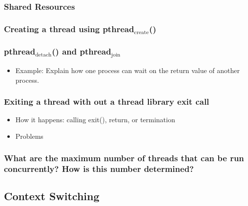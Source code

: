 \documentclass[11pt]{article}
\begin{document}
\subsubsection{Shared Resources}
\label{sec-6.2.1}

\subsubsection{Creating a thread using pthread$_{\mathrm{create}}$()}
\label{sec-6.2.2}

\subsubsection{pthread$_{\mathrm{detach}}$() and pthread$_{\mathrm{join}}$}
\label{sec-6.2.3}

\begin{itemize}

\item Example: Explain how one process can wait on the return value of another process.\\
\label{sec-6.2.3.1}

\end{itemize} %
\subsubsection{Exiting a thread with out a thread library exit call}
\label{sec-6.2.4}

\begin{itemize}

\item How it happens: calling exit(), return, or termination\\
\label{sec-6.2.4.1}


\item Problems\\
\label{sec-6.2.4.2}

\end{itemize} %
\subsubsection{What are the maximum number of threads that can be run concurrently? How is this number determined?}
\label{sec-6.2.5}

\subsection{Context Switching}
\label{sec-6.3}
\end{document}
